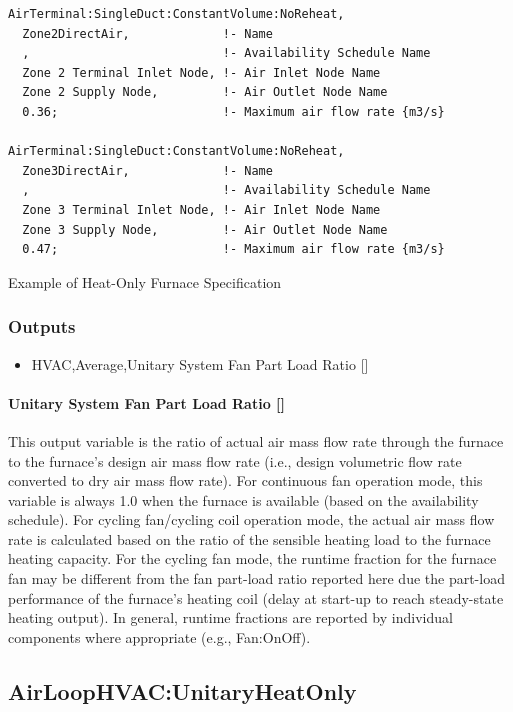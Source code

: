 \begin{lstlisting}
AirTerminal:SingleDuct:ConstantVolume:NoReheat,
  Zone2DirectAir,             !- Name
  ,                           !- Availability Schedule Name
  Zone 2 Terminal Inlet Node, !- Air Inlet Node Name
  Zone 2 Supply Node,         !- Air Outlet Node Name
  0.36;                       !- Maximum air flow rate {m3/s}

AirTerminal:SingleDuct:ConstantVolume:NoReheat,
  Zone3DirectAir,             !- Name
  ,                           !- Availability Schedule Name
  Zone 3 Terminal Inlet Node, !- Air Inlet Node Name
  Zone 3 Supply Node,         !- Air Outlet Node Name
  0.47;                       !- Maximum air flow rate {m3/s}
\end{lstlisting}

Example of Heat-Only Furnace Specification

\subsubsection{Outputs}\label{outputs-4-018}

\begin{itemize}
\tightlist
\item
  HVAC,Average,Unitary System Fan Part Load Ratio {[]}
\end{itemize}

\paragraph{Unitary System Fan Part Load Ratio {[]}}\label{unitary-system-fan-part-load-ratio-5}

This output variable is the ratio of actual air mass flow rate through the furnace to the furnace's design air mass flow rate (i.e., design volumetric flow rate converted to dry air mass flow rate). For continuous fan operation mode, this variable is always 1.0 when the furnace is available (based on the availability schedule). For cycling fan/cycling coil operation mode, the actual air mass flow rate is calculated based on the ratio of the sensible heating load to the furnace heating capacity. For the cycling fan mode, the runtime fraction for the furnace fan may be different from the fan part-load ratio reported here due the part-load performance of the furnace's heating coil (delay at start-up to reach steady-state heating output). In general, runtime fractions are reported by individual components where appropriate (e.g., Fan:OnOff).

\subsection{AirLoopHVAC:UnitaryHeatOnly}\label{airloophvacunitaryheatonly}

